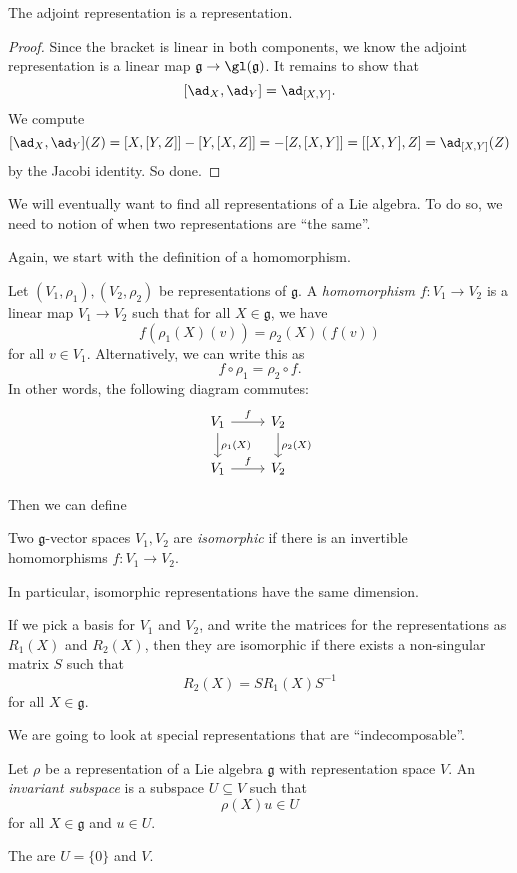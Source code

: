 \documentclass[a4paper]{article}
\begin{document}
\begin{prop}
  The adjoint representation is a representation.
\end{prop}

\begin{proof}
  Since the bracket is linear in both components, we know the adjoint representation is a linear map $\mathfrak{g} \to \gl(\mathfrak{g})$. It remains to show that
  \[
    [\ad_X, \ad_Y] = \ad_{[X, Y]}.
  \]
  We compute
  \[
    [\ad_X, \ad_Y](Z) = [X, [Y, Z]] - [Y, [X, Z]] = -[Z, [X, Y]] = [[X, Y], Z] = \ad_{[X, Y]}(Z)
  \]
  by the Jacobi identity. So done.
\end{proof}

We will eventually want to find all representations of a Lie algebra. To do so, we need to notion of when two representations are ``the same''.

Again, we start with the definition of a homomorphism.
\begin{defi}
  Let $(V_1, \rho_1), (V_2, \rho_2)$ be representations of $\mathfrak{g}$. A \emph{homomorphism} $f: V_1 \to V_2$ is a linear map $V_1 \to V_2$ such that for all $X \in \mathfrak{g}$, we have
  \[
    f(\rho_1(X)(v)) = \rho_2(X)(f(v))
  \]
  for all $v \in V_1$. Alternatively, we can write this as
  \[
    f \circ \rho_1 = \rho_2 \circ f.
  \]
  In other words, the following diagram commutes:
  \[
    \begin{tikzcd}
      V_1 \ar[r, "f"] \ar[d, "\rho_1(X)"] & V_2 \ar[d, "\rho_2(X)"]\\
      V_1 \ar[r, "f"] & V_2
    \end{tikzcd}
  \]
\end{defi}

Then we can define
\begin{defi}
  Two $\mathfrak{g}$-vector spaces $V_1, V_2$ are \emph{isomorphic} if there is an invertible homomorphisms $f: V_1 \to V_2$.
\end{defi}
In particular, isomorphic representations have the same dimension.

If we pick a basis for $V_1$ and $V_2$, and write the matrices for the representations as $R_1(X)$ and $R_2(X)$, then they are isomorphic if there exists a non-singular matrix $S$ such that
\[
  R_2(X) = SR_1(X) S^{-1}
\]
for all $X \in \mathfrak{g}$.

We are going to look at special representations that are ``indecomposable''.
\begin{defi}
  Let $\rho$ be a representation of a Lie algebra $\mathfrak{g}$ with representation space $V$. An \emph{invariant subspace} is a subspace $U \subseteq V$ such that
  \[
    \rho(X) u \in U
  \]
  for all $X \in \mathfrak{g}$ and $u \in U$.

  The  are $U = \{0\}$ and $V$.
\end{defi}
\end{document}
